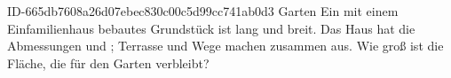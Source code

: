 \begin{exercise}
      {ID-665db7608a26d07ebec830c00c5d99cc741ab0d3}
      {Garten}
  \ifproblem\problem
    Ein mit einem Einfamilienhaus bebautes Grundstück ist  lang und
     breit. Das Haus hat die Abmessungen  und ;
    Terrasse und Wege machen zusammen  aus. Wie groß ist die
    Fläche, die für den Garten verbleibt?
  \fi
\end{exercise}
